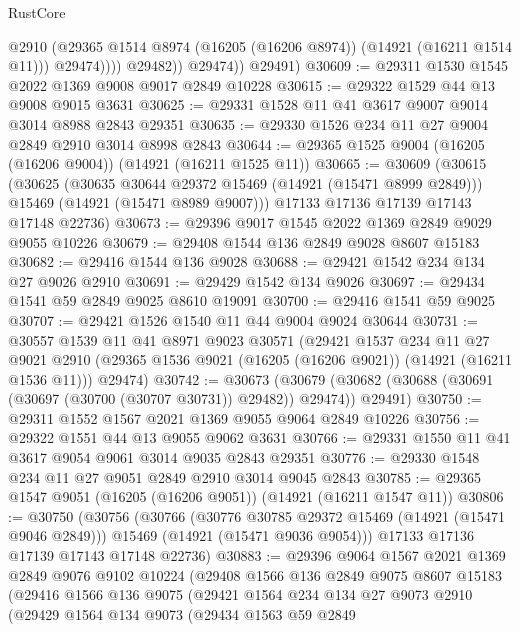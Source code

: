 \begin{lexlean}{RustCore}
\begin{coremodule}
                      @2910
                      (@29365 @1514 @8974 (@16205 (@16206 @8974)) (@14921 (@16211 @1514 @11)))
                      @29474))))
              @29482))
          @29474))
      @29491)
@30609 := @29311 @1530 @1545 @2022 @1369 @9008 @9017 @2849 @10228
@30615 := @29322 @1529 @44 @13 @9008 @9015 @3631
@30625 := @29331 @1528 @11 @41 @3617 @9007 @9014 @3014 @8988 @2843 @29351
@30635 := @29330 @1526 @234 @11 @27 @9004 @2849 @2910 @3014 @8998 @2843
@30644 := @29365 @1525 @9004 (@16205 (@16206 @9004)) (@14921 (@16211 @1525 @11))
@30665 := @30609
    (@30615
      (@30625
        (@30635 @30644 @29372 @15469 (@14921 (@15471 @8999 @2849)))
        @15469
        (@14921 (@15471 @8989 @9007)))
      @17133
      @17136
      @17139
      @17143
      @17148
      @22736)
@30673 := @29396 @9017 @1545 @2022 @1369 @2849 @9029 @9055 @10226
@30679 := @29408 @1544 @136 @2849 @9028 @8607 @15183
@30682 := @29416 @1544 @136 @9028
@30688 := @29421 @1542 @234 @134 @27 @9026 @2910
@30691 := @29429 @1542 @134 @9026
@30697 := @29434 @1541 @59 @2849 @9025 @8610 @19091
@30700 := @29416 @1541 @59 @9025
@30707 := @29421 @1526 @1540 @11 @44 @9004 @9024 @30644
@30731 := @30557
    @1539
    @11
    @41
    @8971
    @9023
    @30571
    (@29421
      @1537
      @234
      @11
      @27
      @9021
      @2910
      (@29365 @1536 @9021 (@16205 (@16206 @9021)) (@14921 (@16211 @1536 @11)))
      @29474)
@30742 := @30673
    (@30679 (@30682 (@30688 (@30691 (@30697 (@30700 (@30707 @30731)) @29482)) @29474)) @29491)
@30750 := @29311 @1552 @1567 @2021 @1369 @9055 @9064 @2849 @10226
@30756 := @29322 @1551 @44 @13 @9055 @9062 @3631
@30766 := @29331 @1550 @11 @41 @3617 @9054 @9061 @3014 @9035 @2843 @29351
@30776 := @29330 @1548 @234 @11 @27 @9051 @2849 @2910 @3014 @9045 @2843
@30785 := @29365 @1547 @9051 (@16205 (@16206 @9051)) (@14921 (@16211 @1547 @11))
@30806 := @30750
    (@30756
      (@30766
        (@30776 @30785 @29372 @15469 (@14921 (@15471 @9046 @2849)))
        @15469
        (@14921 (@15471 @9036 @9054)))
      @17133
      @17136
      @17139
      @17143
      @17148
      @22736)
@30883 := @29396
    @9064
    @1567
    @2021
    @1369
    @2849
    @9076
    @9102
    @10224
    (@29408
      @1566
      @136
      @2849
      @9075
      @8607
      @15183
      (@29416
        @1566
        @136
        @9075
        (@29421
          @1564
          @234
          @134
          @27
          @9073
          @2910
          (@29429
            @1564
            @134
            @9073
            (@29434
              @1563
              @59
              @2849

\end{coremodule}
\end{lexlean}
